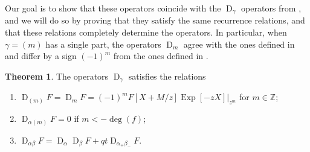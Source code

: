 \documentclass[reqno]{amsart}
\theoremstyle{plain}
\theoremstyle{definition}
\newtheorem{theorem}{Theorem}[section]
\theoremstyle{remark}
\DeclareMathOperator{\D}{D}
\DeclareMathOperator{\Exp}{Exp}
\newcommand{\<}{\langle}
\renewcommand{\>}{\rangle}
\begin{document}
Our goal is to show that these operators coincide with the $\D_\gamma$ operators from \cite{BHMPS2023ShuffleAnyLine}, and we will do so by proving that they satisfy the same recurrence relations, and that these relations completely determine the operators. In particular, when $\gamma = (m)$ has a single part, the operators $\D_m$ agree with the ones defined in \cite{BHMPS2023ShuffleAnyLine} and differ by a sign $(-1)^m$ from the ones defined in \cite{GarsiaHaimanTesler1999ExplicitPlethysticFormulas}.

\begin{theorem}
    \label{thm:dgamma-recursion}
    The operators $\D_\gamma$ satisfies the relations
    \begin{enumerate}
        \item \label{dop:onepart} $\D_{(m)} F = \D_m F = (-1)^m F[X + M/z] \Exp[-zX] \rvert_{z^m}$ for $m \in \mathbb{Z}$;
        \item \label{dop:neg} $\D_{\alpha (m)} F = 0$ if $m < -\deg(f)$;
        \item \label{dop:recursion} $\D_{\alpha \beta} F = \D_\alpha \D_\beta F + qt \D_{\alpha_+ \beta_-} F$.
    \end{enumerate}
\end{theorem}
\end{document}
